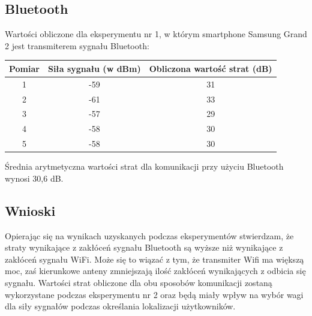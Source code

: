 \subsection{Bluetooth}
Wartości obliczone dla eksperymentu nr 1, w którym smartphone Samsung Grand 2 jest transmiterem sygnału Bluetooth:
\begin{center}
	\begin{minipage}{\linewidth}
		\begin{tabular}{|c|c|c|}
			\hline 
			Pomiar & Siła sygnału (w dBm) & Obliczona wartość strat (dB) \\ 
			\hline 
			1 & -59 & 31 \\ 
			\hline 
			2 & -61 & 33 \\ 
			\hline 
			3 & -57 & 29 \\ 
			\hline 
			4 & -58 & 30 \\ 
			\hline 
			5 & -58 & 30 \\ 
			\hline 
		\end{tabular} 
	\end{minipage} 
\end{center}
Średnia arytmetyczna wartości strat dla komunikacji przy użyciu Bluetooth wynosi 30,6 dB.
\subsection{Wnioski}
Opierając się na wynikach uzyskanych podczas eksperymentów stwierdzam, że straty wynikające z zakłóceń sygnału Bluetooth są wyższe niż wynikające z zakłóceń sygnału WiFi. Może się to wiązać z tym, że transmiter Wifi ma większą moc, zaś kierunkowe anteny zmniejszają ilość zakłóceń wynikających z odbicia się sygnału. Wartości strat obliczone dla obu sposobów komunikacji zostaną wykorzystane podczas eksperymentu nr 2 oraz będą miały wpływ na wybór wagi dla siły sygnałów podczas określania lokalizacji użytkowników.
